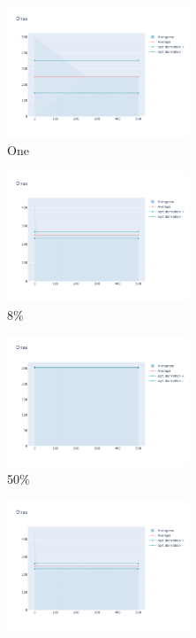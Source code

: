 \documentclass[12pt, fleqn]{report}                             %
\theoremstyle{break}                                            %
\begin{document}
      \begin{figure}[ht!]
        \centering
        \begin{subfigure}[b]{0.4\linewidth}
          \includegraphics[width=0.6\textwidth]{Images/77/dia-a.png}
          \caption{One}
        \end{subfigure}
        \begin{subfigure}[b]{0.4\linewidth}
          \includegraphics[width=0.6\textwidth]{Images/77/dia-b.png}
          \caption{8\%}
        \end{subfigure}
        \begin{subfigure}[b]{0.4\linewidth}
          \includegraphics[width=0.6\textwidth]{Images/77/dia-c.png}
          \caption{50\%}
        \end{subfigure}
        \begin{subfigure}[b]{0.4\linewidth}
          \includegraphics[width=0.6\textwidth]{Images/77/dia-d.png}

\end{subfigure}
\end{figure}
\end{document}
